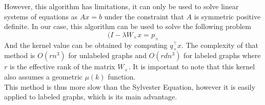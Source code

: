 \documentclass{article}
\theoremstyle{definition}
\begin{document}
However, this algorithm has limitations, it can only be used to solve linear systems of equations as $Ax=b$ under the constraint that $A$ is symmetric positive definite.
In our case, this algorithm can be used to solve the following problem 
\begin{equation}
	(I-\lambda W_{\times}x=p_{\times}
\end{equation}
And the kernel value can be obtained by computing $q_{\times}^{\top}x$. The complexity of that method is $O(rn^3)$ for unlabeled graphs and $O(rdn^3)$ for labeled graphs where $r$ is the effective rank of the matrix $W_{\times}$. It is important to note that this kernel also assumes a geometric $\mu(k)$ function. \\
This method is thus more slow than the Sylvester Equation, however it is easily applied to labeled graphs, which is its main advantage.
\end{document}
